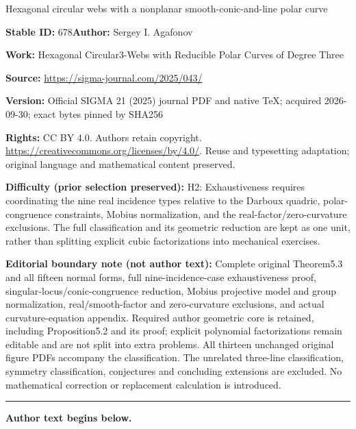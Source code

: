 \documentclass[11pt]{article}
\numberwithin{equation}{section}
\numberwithin{equation}{section}
\begin{document}
\begin{center}\Large Hexagonal circular webs with a nonplanar smooth-conic-and-line polar curve\end{center}
\noindent\textbf{Stable ID:} 678\quad\textbf{Author:} Sergey I. Agafonov\par
\noindent\textbf{Work:} Hexagonal Circular3-Webs with Reducible Polar Curves of Degree Three\par
\noindent\textbf{Source:} \url{https://sigma-journal.com/2025/043/}\par
\noindent\textbf{Version:} Official SIGMA 21 (2025) journal PDF and native TeX; acquired 2026-09-30; exact bytes pinned by SHA256\par
\noindent\textbf{Rights:} CC BY 4.0. Authors retain copyright. \url{https://creativecommons.org/licenses/by/4.0/}. Reuse and typesetting adaptation; original language and mathematical content preserved.\par
\noindent\textbf{Difficulty (prior selection preserved):} {\CJKfont H2: Exhaustiveness requires coordinating the nine real incidence types relative to the Darboux quadric, polar-congruence constraints, Mobius normalization, and the real-factor/zero-curvature exclusions. The full classification and its geometric reduction are kept as one unit, rather than splitting explicit cubic factorizations into mechanical exercises.}\par
\medskip\noindent\textbf{Editorial boundary note (not author text):} Complete original Theorem5.3 and all fifteen normal forms, full nine-incidence-case exhaustiveness proof, singular-locus/conic-congruence reduction, Mobius projective model and group normalization, real/smooth-factor and zero-curvature exclusions, and actual curvature-equation appendix. Required author geometric core is retained, including Proposition5.2 and its proof; explicit polynomial factorizations remain editable and are not split into extra problems. All thirteen unchanged original figure PDFs accompany the classification. The unrelated three-line classification, symmetry classification, conjectures and concluding extensions are excluded. No mathematical correction or replacement calculation is introduced.\par
\medskip\hrule\medskip\noindent\textbf{Author text begins below.}\par
\setcounter{section}{1}
\end{document}
